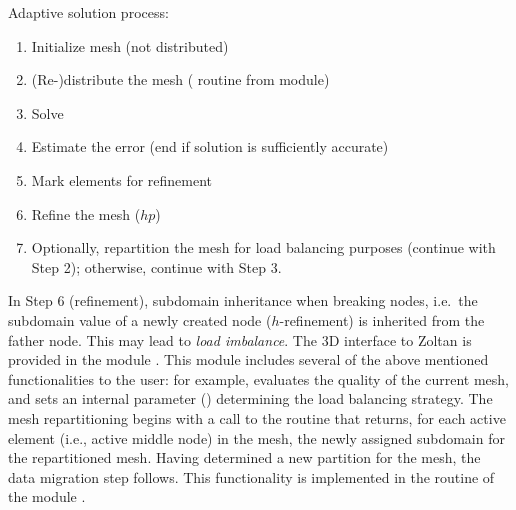 Adaptive solution process:\\
\begin{enumerate}
	\itemsep -15pt
	\item Initialize mesh (not distributed) \\
	\item (Re-)distribute the mesh ( routine from  module) \\
	\item Solve \\
	\item Estimate the error (end if solution is sufficiently accurate) \\
	\item Mark elements for refinement \\
	\item Refine the mesh ($hp$) \\
	\item Optionally, repartition the mesh for load balancing purposes (continue with Step 2); otherwise, continue with Step 3.
\end{enumerate}

In Step 6 (refinement), subdomain inheritance when breaking nodes, i.e.~the subdomain value  of a newly created node ($h$-refinement) is inherited from the father node. This may lead to \emph{load imbalance}. The \hp3D interface to Zoltan is provided in the module . This module includes several of the above mentioned functionalities to the user: for example,  evaluates the quality of the current mesh, and  sets an internal parameter () determining the load balancing strategy. The mesh repartitioning begins with a call to the routine  that returns, for each active element (i.e., active middle node) in the mesh, the newly assigned subdomain for the repartitioned mesh. Having determined a new partition for the mesh, the data migration step follows. This functionality is implemented in the  routine of the module . 

